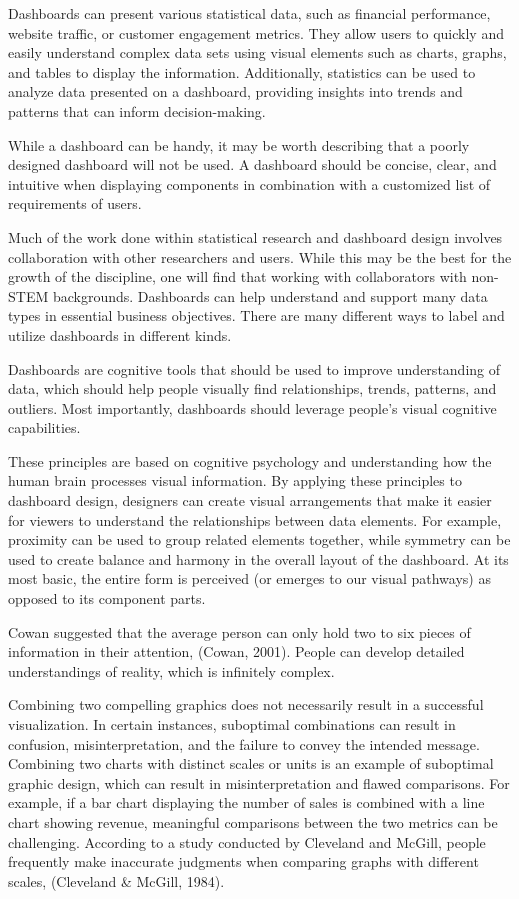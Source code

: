 \documentclass[print]{nuthesis}
\begin{document}
Dashboards can present various statistical data, such as financial performance, website traffic, or customer engagement metrics.
They allow users to quickly and easily understand complex data sets using visual elements such as charts, graphs, and tables to display the information.
Additionally, statistics can be used to analyze data presented on a dashboard, providing insights into trends and patterns that can inform decision-making.

While a dashboard can be handy, it may be worth describing that a poorly designed dashboard will not be used.
A dashboard should be concise, clear, and intuitive when displaying components in combination with a customized list of requirements of users.

Much of the work done within statistical research and dashboard design involves collaboration with other researchers and users.
While this may be the best for the growth of the discipline, one will find that working with collaborators with non-STEM backgrounds.
Dashboards can help understand and support many data types in essential business objectives.
There are many different ways to label and utilize dashboards in different kinds.

Dashboards are cognitive tools that should be used to improve understanding of data, which should help people visually find relationships, trends, patterns, and outliers.
Most importantly, dashboards should leverage people's visual cognitive capabilities.

These principles are based on cognitive psychology and understanding how the human brain processes visual information.
By applying these principles to dashboard design, designers can create visual arrangements that make it easier for viewers to understand the relationships between data elements.
For example, proximity can be used to group related elements together, while symmetry can be used to create balance and harmony in the overall layout of the dashboard.
At its most basic, the entire form is perceived (or emerges to our visual pathways) as opposed to its component parts.

Cowan suggested that the average person can only hold two to six pieces of information in their attention, (Cowan, 2001).
People can develop detailed understandings of reality, which is infinitely complex.

Combining two compelling graphics does not necessarily result in a successful visualization.
In certain instances, suboptimal combinations can result in confusion, misinterpretation, and the failure to convey the intended message.
Combining two charts with distinct scales or units is an example of suboptimal graphic design, which can result in misinterpretation and flawed comparisons.
For example, if a bar chart displaying the number of sales is combined with a line chart showing revenue, meaningful comparisons between the two metrics can be challenging.
According to a study conducted by Cleveland and McGill, people frequently make inaccurate judgments when comparing graphs with different scales, (Cleveland \& McGill, 1984).
\end{document}
